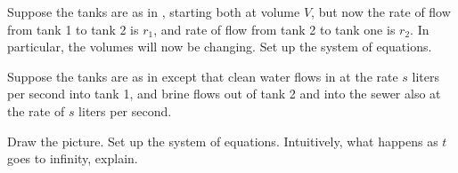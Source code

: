 \begin{exercise}
Suppose the tanks are as in 
, starting both at volume $V$,
but now the rate of flow from tank 1 to tank 2 is $r_1$, and
rate of flow from tank 2 to tank one is $r_2$.  In particular,
the volumes will now be changing.  Set up the system of equations.
\end{exercise}

\begin{exercise}\ansMark%
Suppose the tanks are as in 
 except that clean water flows in
at the rate $s$ liters per second into tank 1, and brine flows out of tank 2
and into the sewer also at the rate of $s$ liters per second.
\begin{tasks}
\task Draw the picture.
\task Set up the system of equations.
\task Intuitively, what happens as $t$ goes to infinity, explain.
\end{tasks}
\end{exercise}

